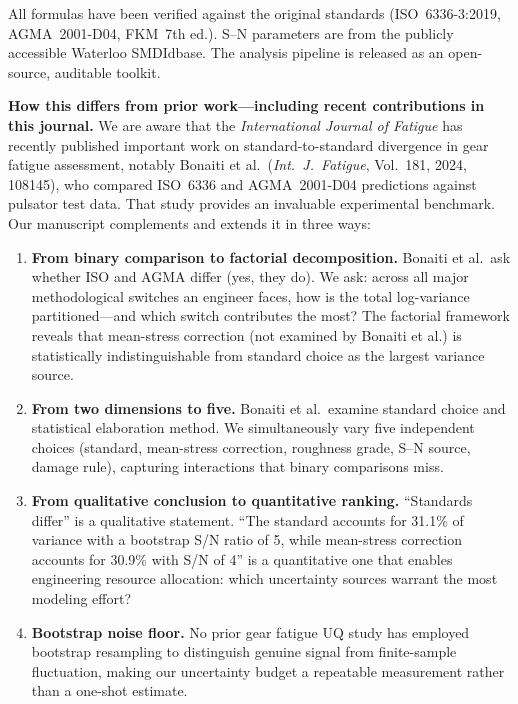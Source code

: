 \documentclass[12pt,a4paper]{article}
\begin{document}
All formulas have been verified against the original standards (ISO~6336-3:2019,
AGMA~2001-D04, FKM~7th ed.). S--N parameters are from the publicly
accessible Waterloo SMDIdbase. The analysis pipeline is released as an
open-source, auditable toolkit.

\vspace{0.3cm}
\noindent\textbf{How this differs from prior work---including recent
contributions in this journal.}
We are aware that the \textit{International Journal of Fatigue} has recently
published important work on standard-to-standard divergence in gear fatigue
assessment, notably Bonaiti et al.\ (\textit{Int.\ J.\ Fatigue}, Vol.~181, 2024,
108145), who compared ISO~6336 and AGMA~2001-D04 predictions against pulsator
test data. That study provides an invaluable experimental benchmark. Our
manuscript complements and extends it in three ways:

\begin{enumerate}
  \item \textbf{From binary comparison to factorial decomposition.}
        Bonaiti et al.\ ask whether ISO and AGMA differ (yes, they do). We
        ask: across all major methodological switches an engineer faces, how
        is the total log-variance partitioned---and which switch contributes
        the most? The factorial framework reveals that mean-stress correction
        (not examined by Bonaiti et al.) is statistically indistinguishable
        from standard choice as the largest variance source.

  \item \textbf{From two dimensions to five.} Bonaiti et al.\ examine
        standard choice and statistical elaboration method. We simultaneously
        vary five independent choices (standard, mean-stress correction,
        roughness grade, S--N source, damage rule), capturing interactions
        that binary comparisons miss.

  \item \textbf{From qualitative conclusion to quantitative ranking.}
        ``Standards differ'' is a qualitative statement. ``The standard
        accounts for 31.1\% of variance with a bootstrap S/N ratio of 5,
        while mean-stress correction accounts for 30.9\% with S/N of 4''
        is a quantitative one that enables engineering resource allocation:
        which uncertainty sources warrant the most modeling effort?

  \item \textbf{Bootstrap noise floor.} No prior gear fatigue UQ study has
        employed bootstrap resampling to distinguish genuine signal from
        finite-sample fluctuation, making our uncertainty budget a
        repeatable measurement rather than a one-shot estimate.
\end{enumerate}
\end{document}
